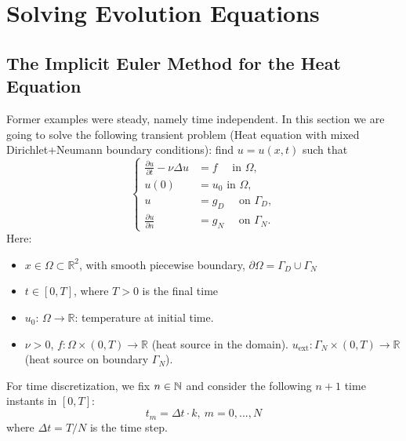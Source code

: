 \documentclass[12pt]{article}
\newcommand{\R}{{\mathbb R}}
\begin{document}
\section{Solving Evolution Equations}
\label{sec:solv-evol-equat}

\subsection{The Implicit Euler Method for the Heat Equation}
\label{sec:heat-equation}
\newcommand{\deltaT}{\Delta t}

Former examples were steady, namely time independent. In this section we are going
to solve the following transient problem (Heat equation with mixed
Dirichlet+Neumann boundary conditions): find $u=u(x,t)$ such that
\begin{equation}
  \label{eq:heat equation}
  \left\{
    \begin{aligned}
      \frac{\partial u}{\partial t} -\nu\Delta u &= f \quad \text{ in } \Omega, \\
      u(0)&=u_0 \text{ in } \Omega, \\
      u &= g_D \quad \text{ on } \Gamma_D, \\
      \frac{\partial u}{\partial n} &= g_N \quad \text{ on } \Gamma_N.
    \end{aligned}
    \right.
\end{equation}
Here:
\begin{itemize}
\item $x\in\Omega\subset\R^2$, with smooth piecewise boundary,  $\partial\Omega=\Gamma_D\cup\Gamma_N$
\item $t\in [0,T]$, where $T>0$ is the final time
\item $u_0$: $\Omega\to\R$: temperature at initial time.
\item $\nu>0$, $f:\Omega\times(0,T)\to\R$ (heat source in the domain).
  $u_{\text{ext}}:\Gamma_N\times(0,T)\to\R$ (heat source on boundary $\Gamma_N$).
\end{itemize}

For time discretization, we fix $n\in{\mathbb N}$ and consider the
following $n+1$ time instants in $[0,T]$:
$$t_m= \deltaT\cdot k, \ m=0, ..., N$$
where $\deltaT=T/N$ is the time step.
\end{document}
